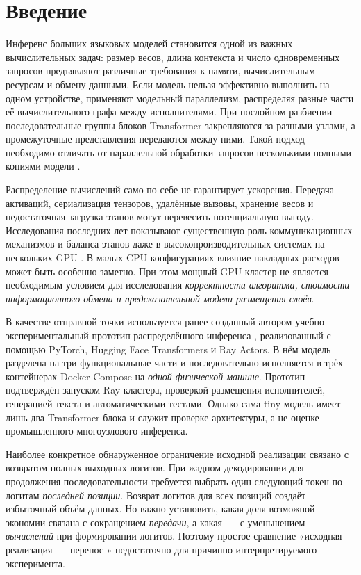 \section{Введение}

Инференс больших языковых моделей становится одной из важных вычислительных задач: размер весов, длина контекста и число одновременных запросов предъявляют различные требования к памяти, вычислительным ресурсам и обмену данными. Если модель нельзя эффективно выполнить на одном устройстве, применяют модельный параллелизм, распределяя разные части её вычислительного графа между исполнителями. При послойном разбиении последовательные группы блоков Transformer закрепляются за разными узлами, а промежуточные представления передаются между ними. Такой подход необходимо отличать от параллельной обработки запросов несколькими полными копиями модели \cite{petals2023,deepspeed2022}.

Распределение вычислений само по себе не гарантирует ускорения. Передача активаций, сериализация тензоров, удалённые вызовы, хранение весов и недостаточная загрузка этапов могут перевесить потенциальную выгоду. Исследования последних лет показывают существенную роль коммуникационных механизмов и баланса этапов даже в высокопроизводительных системах на нескольких GPU \cite{jekel2026,hwang2026}. В малых CPU-конфигурациях влияние накладных расходов может быть особенно заметно. При этом мощный GPU-кластер не является необходимым условием для исследования \emph{корректности алгоритма, стоимости информационного обмена и предсказательной модели размещения слоёв}.

В качестве отправной точки используется ранее созданный автором учебно-экспериментальный прототип распределённого инференса , реализованный с помощью PyTorch, Hugging Face Transformers и Ray Actors. В нём модель разделена на три функциональные части и последовательно исполняется в трёх контейнерах Docker Compose на \emph{одной физической машине}. Прототип подтверждён запуском Ray-кластера, проверкой размещения исполнителей, генерацией текста и автоматическими тестами. Однако сама tiny-модель имеет лишь два Transformer-блока и служит проверке архитектуры, а не оценке промышленного многоузлового инференса.

Наиболее конкретное обнаруженное ограничение исходной реализации связано с возвратом полных выходных логитов. При жадном декодировании для продолжения последовательности требуется выбрать один следующий токен по логитам \emph{последней позиции}. Возврат логитов для всех позиций создаёт избыточный объём данных. Но важно установить, какая доля возможной экономии связана с сокращением \emph{передачи}, а какая~--- с уменьшением \emph{вычислений} при формировании логитов. Поэтому простое сравнение «исходная реализация~--- перенос » недостаточно для причинно интерпретируемого эксперимента.

